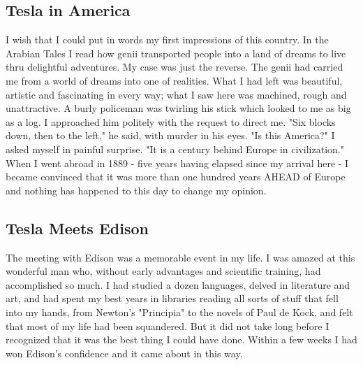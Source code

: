 \documentclass[a4paper,12pt,english,twoside,openright]{memoir}
\begin{document}
\subsection{Tesla in America}
I wish that I could put in words my first impressions of this country.  In the Arabian Tales I read 
how genii transported people into a land of dreams to live thru delightful adventures.  My case 
was just the reverse.  The genii had carried me from a world of dreams into one of realities.  What 
I had left was beautiful, artistic and fascinating in every way; what I saw here was machined, 
rough and unattractive.  A burly policeman was twirling his stick which looked to me as big as a 
log.  I approached him politely with the request to direct me.  "Six blocks down, then to the left," 
he said, with murder in his eyes.  "Is this America?" I asked myself in painful surprise.  "It is a 
century behind Europe in civilization." When I went abroad in 1889 - five years having elapsed 
since my arrival here - I became convinced that it was more than one hundred years AHEAD of 
Europe and nothing has happened to this day to change my opinion.  

\vspace{-1em}
\subsection{Tesla Meets Edison}
The meeting with Edison was a memorable event in my life.  I was amazed at this wonderful man 
who, without early advantages and scientific training, had accomplished so much.  I had studied a 
dozen languages, delved in literature and art, and had spent my best years in libraries reading all 
sorts of stuff that fell into my hands, from Newton's "Principia" to the novels of Paul de Kock, and 
felt that most of my life had been squandered.  But it did not take long before I recognized that it 
was the best thing I could have done.  Within a few weeks I had won Edison's confidence and it 
came about in this way.  
\end{document}
